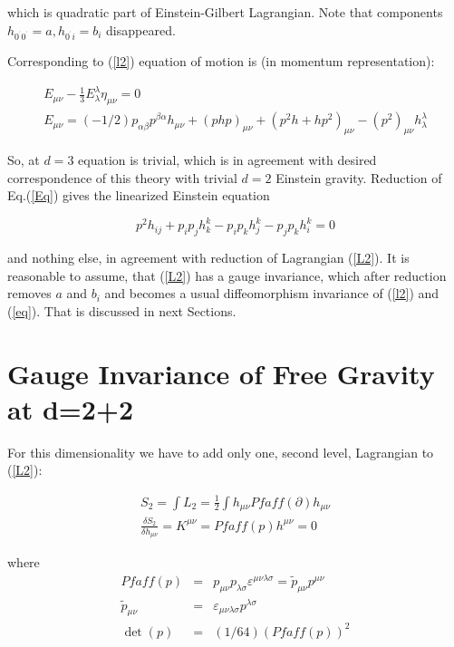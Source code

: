 \documentclass[a4paper,12pt]{article}
\begin{document}
which is quadratic part of Einstein-Gilbert Lagrangian. Note that
components $ h_{0^{^{\prime }}0^{^{\prime }}}=a,h_{0^{^{\prime
}}i}=b_{i}$ disappeared.

Corresponding to (\ref{l2}) equation of motion is (in momentum
representation):

\begin{eqnarray}
E_{\mu \nu }-\frac{1}{3}E_{\lambda }^{\lambda }\eta _{\mu \nu }=0
\label{Eq} \\
E_{\mu \nu } =(-1/2)p_{\alpha \beta }p^{\beta \alpha }h_{\mu \nu
}+(php)_{\mu \nu }+(p^{2}h+hp^{2})_{\mu \nu }-(p^{2})_{\mu
\nu}h_{\lambda}^{\lambda }
\end{eqnarray}

So, at $d=3$ equation is trivial, which is in agreement with
desired correspondence of this theory with trivial $d=2$ Einstein
gravity. Reduction of Eq.(\ref{Eq}) gives the linearized Einstein
equation

\begin{equation}
p^{2}h_{ij}+p_{i}p_{j}h_{k}^{k}-p_{i}p_{k}h_{j}^{k}-p_{j}p_{k}h_{i}^{k}=0
\label{eq}
\end{equation}

and nothing else, in agreement with reduction of Lagrangian
(\ref{L2}). It is reasonable to assume, that (\ref{L2}) has a
gauge invariance, which after reduction removes $a$ and $b_{i}$
and becomes a usual diffeomorphism invariance of (\ref{l2}) and
(\ref{eq}). That is discussed in next Sections.

\section{Gauge Invariance of Free Gravity at d=2+2 }

For this dimensionality we have to add only one, second level,
Lagrangian to (\ref{L2}):

\begin{eqnarray}
S_2=\int L_{2} =\frac{1}{2}\int h_{\mu \nu }Pfaff(\partial)h_{\mu \nu } \label{22eq}\\
\frac {\delta S_2} {\delta h_{\mu \nu }}=K^{\mu \nu }
=Pfaff(p)h^{\mu \nu }=0
\end{eqnarray}

where
\begin{eqnarray}
Pfaff(p) &=&p_{\mu \nu }p_{\lambda \sigma }\varepsilon ^{\mu \nu
\lambda
\sigma }=\widetilde{p}_{\mu \nu }p^{\mu \nu } \\
\widetilde{p}_{\mu \nu } &=&\varepsilon _{\mu \nu \lambda \sigma }p^{\lambda
\sigma } \\
\det (p) &=&(1/64)(Pfaff(p))^{2}
\end{eqnarray}
\end{document}
